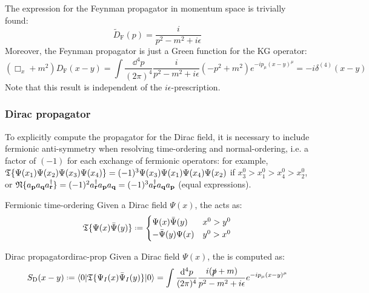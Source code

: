 The expression for the Feynman propagator in momentum space is trivially found:
\begin{equation}
  \tilde{D}_\text{F}(p) = \frac{i}{p^2 - m^2 + i\epsilon}
  \label{eq:corr-func}
\end{equation}
Moreover, the Feynman propagator is just a Green function for the KG operator:
\begin{equation*}
  (\Box_x + m^2) D_\text{F}(x-y) = \int \frac{\dd^4p}{(2\pi)^4} \frac{i}{p^2 - m^2 + i\epsilon} (-p^2 + m^2) e^{-i p_\mu (x-y)^\mu} = -i \delta^{(4)}(x-y)
\end{equation*}
Note that this result is independent of the $ i\epsilon $-prescription.

\subsubsection{Dirac propagator}

To explicitly compute the propagator for the Dirac field, it is necessary to include fermionic anti-symmetry when resolving time-ordering and normal-ordering, i.e. a factor of $ (-1) $ for each exchange of fermionic operators: for example, $ \mathfrak{T}\{\Psi(x_1) \Psi(x_2) \Psi(x_3) \Psi(x_4)\} = (-1)^3 \Psi(x_3) \Psi(x_1) \Psi(x_4) \Psi(x_2) $ if $ x_3^0 > x_1^0 > x_4^0 > x_2^0 $, or $ \mathfrak{N}\{a_{\mathbf{p}} a_{\mathbf{q}} a_{\mathbf{r}}^\dagger\} = (-1)^2 a_{\mathbf{r}}^\dagger a_{\mathbf{p}} a_{\mathbf{q}} = (-1)^3 a_{\mathbf{r}}^\dagger a_{\mathbf{q}} a_{\mathbf{p}} $ (equal expressions).

\begin{definition}{Fermionic time-ordering}{}
  Given a Dirac field $ \Psi(x) $, the  acts as:
  \begin{equation}
    \tempord\{\Psi(x) \bar{\Psi}(y)\} \defeq
    \begin{cases}
      \Psi(x) \bar{\Psi}(y) & x^0 > y^0 \\
      -\bar{\Psi}(y) \Psi(x) & y^0 > x^0 \\
    \end{cases}
    \label{eq:ferm-tempord-ant}
  \end{equation}
\end{definition}

\begin{theorem}{Dirac propagator}{dirac-prop}
  Given a Dirac field $ \Psi(x) $, the  is computed as:
  \begin{equation}
    S_\text{D}(x - y) \defeq \braket{0 | \tempord\{\Psi_I(x) \bar{\Psi}_I(y)\} | 0} = \int \frac{\dd^4p}{(2\pi)^4} \frac{i (\slashed{p} + m)}{p^2 - m^2 + i\epsilon} e^{-i p_\mu (x - y)^\mu}
    \label{eq:dirac-prop}
  \end{equation}
\end{theorem}

